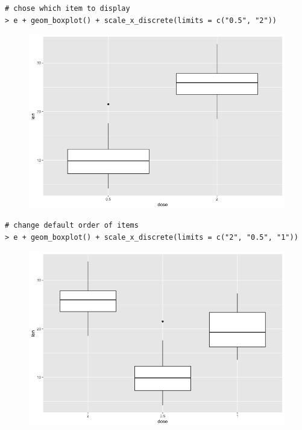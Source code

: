 \begin{lstlisting}[language=html]
# chose which item to display
> e + geom_boxplot() + scale_x_discrete(limits = c("0.5", "2"))
\end{lstlisting}
\begin{figure}[H]\begin{center}\includegraphics[scale=1 ]{ilu/bg74.png}\end{center}\end{figure}
\begin{lstlisting}[language=html]
# change default order of items
> e + geom_boxplot() + scale_x_discrete(limits = c("2", "0.5", "1"))
\end{lstlisting}
\begin{figure}[H]\begin{center}\includegraphics[scale=1 ]{ilu/bg75.png}\end{center}\end{figure}
